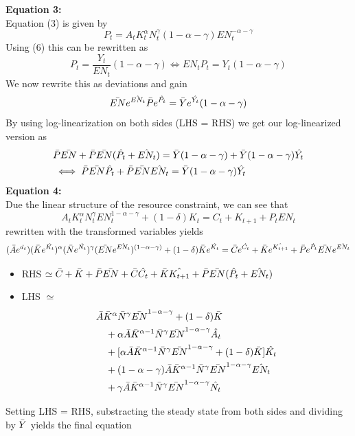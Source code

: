 \documentclass[a4paper,11pt]{article}
\begin{document}
\textbf{Equation 3:}\\
Equation (3) is given by
$$P_t = A_tK_t^\alpha N_t^\gamma (1-\alpha-\gamma)EN_t^{-\alpha-\gamma}$$
Using (6) this can be rewritten as 
$$P_t = \frac{Y_t}{EN_t}(1-\alpha-\gamma) \iff EN_t P_t = Y_t(1-\alpha-\gamma)$$
We now rewrite this as deviations and gain
$$\Bar{EN}e^{\hat{EN_t}} \Bar{P}e^{\hat{P_t}} = \Bar{Y}e^{\hat{Y_t}}(1-\alpha-\gamma)$$
By using log-linearization on both sides (LHS = RHS) we get our log-linearized version as
\begin{align*}
    &\Bar{P}\Bar{EN} + \Bar{P}\Bar{EN}(\hat{P_t} + \hat{EN_t}) = \Bar{Y}(1-\alpha-\gamma) + \Bar{Y}(1-\alpha-\gamma)\hat{Y_t}\\
    &\iff \Bar{P}\Bar{EN}\hat{P_t} + \Bar{P}\Bar{EN}\hat{EN_t} =  \Bar{Y}(1-\alpha-\gamma)\hat{Y_t}
\end{align*}
\textbf{Equation 4:}\\
Due the linear structure of the resource constraint, we can see that 
$$ A_tK_t^\alpha N_t^\gamma EN_t^{1-\alpha-\gamma} + (1-\delta)K_t = C_t + K_{t+1}+P_tEN_t $$
rewritten with the transformed variables yields
$$(\Bar{A}e^{\hat{a_t}})(\Bar{K}e^{\hat{K_t}})^\alpha(\Bar{N}e^{\hat{N_t}})^\gamma (\Bar{EN}e^{\hat{EN_t}})^{(1-\alpha-\gamma)} + (1-\delta)\Bar{K}e^{\hat{K_t}} = \Bar{C}e^{\hat{C_t}} + \Bar{K}e^{\hat{K_{t+1}}} + \Bar{P}e^{\hat{P_t}}\Bar{EN}e^{\hat{EN_t}}$$
\begin{itemize}
    \item RHS $\simeq \Bar{C} + \Bar{K} + \Bar{P}\Bar{EN} + \Bar{C}\hat{C_t} +\Bar{K}\hat{K_{t+1}} + \Bar{P}\Bar{EN}(\hat{P_t} + \hat{EN_t})$
    \item LHS $\simeq$ \begin{align*}
        &\Bar{A} \Bar{K}^{\alpha} \Bar{N}^\gamma \Bar{EN}^{1-\alpha-\gamma}+(1-\delta)\Bar{K} \\
        &\quad + \alpha \Bar{A} \Bar{K}^{\alpha-1} \Bar{N}^\gamma \Bar{EN}^{1-\alpha-\gamma}\hat{A_{t}}\\
        &\quad + [\alpha \Bar{A} \Bar{K}^{\alpha-1} \Bar{N}^\gamma \Bar{EN}^{1-\alpha-\gamma}+(1-\delta)\Bar{K}]\hat{K_t}\\
        &\quad + (1-\alpha-\gamma) \Bar{A} \Bar{K}^{\alpha-1} \Bar{N}^\gamma \Bar{EN}^{1-\alpha-\gamma}\hat{EN_t}\\
        &\quad + \gamma \Bar{A} \Bar{K}^{\alpha-1} \Bar{N}^\gamma \Bar{EN}^{1-\alpha-\gamma}\hat{N_t}
    \end{align*}
\end{itemize}
Setting LHS = RHS, substracting the steady state from both sides and dividing by $\Bar{Y}$ yields the final equation
\end{document}
